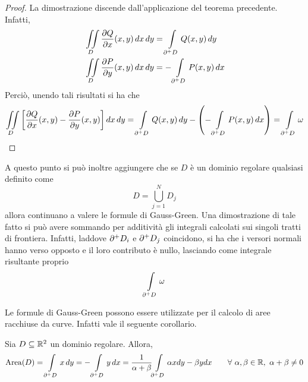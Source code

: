 \begin{proof}
    La dimostrazione discende dall'applicazione del teorema precedente. Infatti,
    \begin{equation*}
        \begin{aligned}
            &\iint\limits_{D}{\frac{\partial Q}{\partial x} (x,y)}\,dx\,dy =  \int\limits_{\partial^+ D}{Q(x,y)}\,dy\\
            &\iint\limits_{D}{\frac{\partial P}{\partial y} (x,y)}\,dx\,dy =  -\int\limits_{\partial^+ D}{P(x,y)}\,dx
        \end{aligned}
    \end{equation*}
    Perciò, unendo tali risultati si ha che
    \begin{equation*}
      \iint\limits_{D}{\left[\frac{\partial Q}{\partial x} (x,y)- \frac{\partial P}{\partial y}(x,y)\right]}\, dx\, dy = \int\limits_{\partial^+ D}{Q(x,y)}\,dy - \left(  -\int\limits_{\partial^+ D}{P(x,y)}\,dx\right)= \int\limits_{\partial^+ D} \omega  
    \end{equation*}
\end{proof}
\begin{oss}
A questo punto si può inoltre aggiungere che se $D$ è un dominio regolare qualsiasi definito come 
\begin{equation*}
    D = \bigcup_{j=1}^{N} D_j
\end{equation*}
allora continuano a valere le formule di Gauss-Green. Una dimostrazione di tale fatto si può avere sommando per additività gli integrali calcolati sui singoli tratti di frontiera. Infatti, laddove $\partial^+ D_i$ e $\partial^+ D_j$ coincidono, si ha che i versori normali hanno verso opposto e il loro contributo è nullo, lasciando come integrale risultante proprio
\begin{equation*}
    \int\limits_{\partial^+ D}{\omega}
\end{equation*}
\end{oss}
Le formule di Gauss-Green possono essere utilizzate per il calcolo di aree racchiuse da curve. Infatti vale il seguente corollario.
\begin{corollary}
Sia $D \subseteq \mathbb{R}^2$ un dominio regolare. Allora,
\begin{equation*}
    \operatorname{Area}(D)= \int\limits_{\partial^+ D}{x}\, dy = -\int\limits_{\partial^+ D}{y}\, dx = \frac{1}{\alpha+\beta}{\int\limits_{\partial^+ D}{\alpha x dy - \beta y dx}} \qquad \forall\ \alpha, \beta \in \mathbb{R},\ \alpha+\beta \neq 0
\end{equation*}
\end{corollary}
